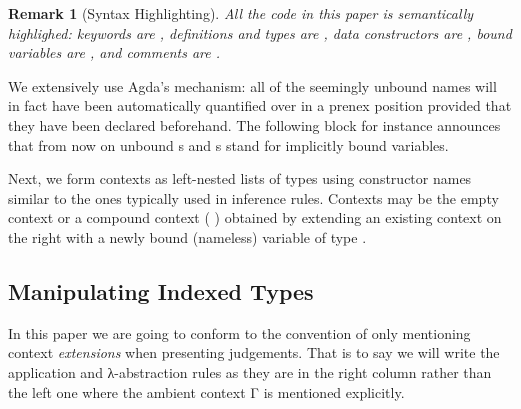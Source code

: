 \documentclass{article}
\newtheorem*{remark}{Remark}
\begin{document}

\begin{remark}[Syntax Highlighting]
  All the code in this paper is semantically highlighed:
  keywords are , definitions and types are ,
  data constructors are , bound variables are
  , and comments are .
\end{remark}

We extensively use Agda's  mechanism: all of
the seemingly unbound names will in fact have been automatically
quantified over in a prenex position provided that they
have been declared beforehand.
%
The following block for instance announces that from now
on unbound s and s stand for implicitly bound
 variables.


Next, we form contexts as left-nested lists of types using
constructor names similar to the ones typically used in
inference rules.
Contexts may be the empty context 
or a compound context ( \AIC{,} ) obtained
by extending an existing context  on the right
with a newly bound (nameless) variable of type .


\subsection{Manipulating Indexed Types}

In this paper we are going to conform to the convention
of only mentioning context \emph{extensions} when
presenting judgements.
%
That is to say we will write the application and
λ-abstraction rules as they are in the right column
rather than the left one where the ambient context Γ
is mentioned explicitly.

\noindent
\begin{minipage}{.4\textwidth}
\end{minipage}\hfill
\begin{minipage}{.4\textwidth}
\end{minipage}
\end{document}
